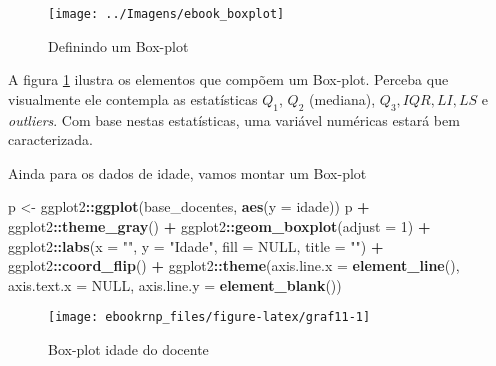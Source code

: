 \documentclass[12pt,]{style/krantz}
\makeatletter
\newenvironment{Shaded}{\begin{snugshade}}{\end{snugshade}}
\newcommand{\KeywordTok}[1]{\textcolor[rgb]{0.13,0.29,0.53}{\textbf{#1}}}
\newcommand{\DataTypeTok}[1]{\textcolor[rgb]{0.13,0.29,0.53}{#1}}
\newcommand{\DecValTok}[1]{\textcolor[rgb]{0.00,0.00,0.81}{#1}}
\newcommand{\StringTok}[1]{\textcolor[rgb]{0.31,0.60,0.02}{#1}}
\newcommand{\OtherTok}[1]{\textcolor[rgb]{0.56,0.35,0.01}{#1}}
\newcommand{\OperatorTok}[1]{\textcolor[rgb]{0.81,0.36,0.00}{\textbf{#1}}}
\newcommand{\NormalTok}[1]{#1}
\newenvironment{kframe}{%
\medskip{}
\setlength{\fboxsep}{.8em}
 \def\at@end@of@kframe{}%
 \ifinner\ifhmode%
  \def\at@end@of@kframe{\end{minipage}}%
  \begin{minipage}{\columnwidth}%
 \fi\fi%
 \def\FrameCommand##1{\hskip\@totalleftmargin \hskip-\fboxsep
 \colorbox{shadecolor}{##1}\hskip-\fboxsep
     \hskip-\linewidth \hskip-\@totalleftmargin \hskip\columnwidth}%
 \MakeFramed {\advance\hsize-\width
   \@totalleftmargin\z@ \linewidth\hsize
   \@setminipage}}%
 {\par\unskip\endMakeFramed%
 \at@end@of@kframe}
\renewenvironment{Shaded}{\begin{kframe}}{\end{kframe}}
\theoremstyle{definition}
\theoremstyle{definition}
\theoremstyle{definition}
\theoremstyle{remark}
\let\BeginKnitrBlock\begin \let\EndKnitrBlock\end
\makeatother
\begin{document}
\begin{figure}[H]

{\centering \texttt{[image: ../Imagens/ebook\_boxplot]} 

}

\caption{Definindo um Box-plot}\label{fig:fig10}
\end{figure}

A figura \ref{fig:fig10} ilustra os elementos que compõem um Box-plot.
Perceba que visualmente ele contempla as estatísticas \(Q_1\), \(Q_2\)
(mediana), \(Q_3, IQR, LI,LS\) e \emph{outliers}. Com base nestas
estatísticas, uma variável numéricas estará bem caracterizada.

\BeginKnitrBlock{example}
\protect\hypertarget{exm:unnamed-chunk-77}{}{\label{exm:unnamed-chunk-77}
}Ainda para os dados de idade, vamos montar um Box-plot
\EndKnitrBlock{example}

\begin{Shaded}
\begin{Highlighting}[]
\NormalTok{p <-}\StringTok{ }\NormalTok{ggplot2}\OperatorTok{::}\KeywordTok{ggplot}\NormalTok{(base_docentes, }\KeywordTok{aes}\NormalTok{(}\DataTypeTok{y =}\NormalTok{ idade))}
\NormalTok{p }\OperatorTok{+}\StringTok{ }\NormalTok{ggplot2}\OperatorTok{::}\KeywordTok{theme_gray}\NormalTok{() }\OperatorTok{+}
\StringTok{  }\NormalTok{ggplot2}\OperatorTok{::}\KeywordTok{geom_boxplot}\NormalTok{(}\DataTypeTok{adjust =} \DecValTok{1}\NormalTok{) }\OperatorTok{+}
\StringTok{  }\NormalTok{ggplot2}\OperatorTok{::}\KeywordTok{labs}\NormalTok{(}\DataTypeTok{x =} \StringTok{""}\NormalTok{, }\DataTypeTok{y =} \StringTok{"Idade"}\NormalTok{, }\DataTypeTok{fill =} \OtherTok{NULL}\NormalTok{, }\DataTypeTok{title =} \StringTok{""}\NormalTok{) }\OperatorTok{+}
\StringTok{  }\NormalTok{ggplot2}\OperatorTok{::}\KeywordTok{coord_flip}\NormalTok{() }\OperatorTok{+}
\StringTok{  }\NormalTok{ggplot2}\OperatorTok{::}\KeywordTok{theme}\NormalTok{(}\DataTypeTok{axis.line.x =} \KeywordTok{element_line}\NormalTok{(), }
                 \DataTypeTok{axis.text.x =} \OtherTok{NULL}\NormalTok{, }
                 \DataTypeTok{axis.line.y =} \KeywordTok{element_blank}\NormalTok{())}
\end{Highlighting}
\end{Shaded}

\begin{figure}[H]

{\centering \texttt{[image: ebookrnp\_files/figure-latex/graf11-1]} 

}

\caption{Box-plot idade do docente}\label{fig:graf11}
\end{figure}
\end{document}
